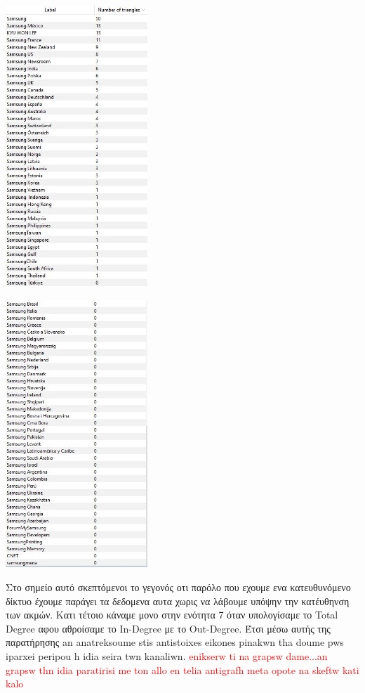 \documentclass[12pt]{article}
\begin{document}
	\begin{center}
		\begin{adjustbox}{valign=t}
			\includegraphics[width=0.4\textwidth]{photos-files/section8/num_of_triangles_1.JPG}
		\end{adjustbox}
		\hfill
		\begin{adjustbox}{valign=t}
			\includegraphics[width=0.4\textwidth]{photos-files/section8/num_of_triangles_2.JPG}
		\end{adjustbox}
	\end{center}
	\par
	Στο σημείο αυτό σκεπτόμενοι το γεγονός οτι παρόλο που εχουμε ενα κατευθυνόμενο δίκτυο έχουμε παράγει τα δεδομενα αυτα χωρις να λάβουμε υπόψην την κατέυθηνση των ακμών. Κατι τέτοιο κάναμε μονο στην ενότητα 7 όταν υπολογίσαμε το Total Degree αφου αθροίσαμε το In-Degree με το Out-Degree. Έτσι μέσω αυτής της παρατήρησης an anatreksoume stis antistoixes eikones pinakwn tha doume pws iparxei peripou h idia seira twn kanaliwn. \textcolor{red}{enikserw ti na grapsw dame...an grapsw thn idia paratirisi me ton allo en telia antigrafh meta opote na skeftw kati kalo}
	
\end{document}
